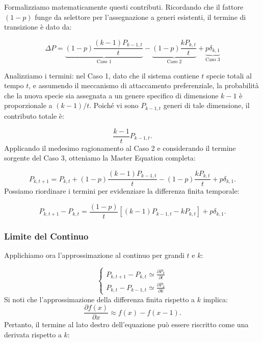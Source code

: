 \noindent Formalizziamo matematicamente questi contributi. Ricordando che il fattore $(1-p)$ funge da selettore per l'assegnazione a generi esistenti, il termine di transizione è dato da:

\begin{equation}
\Delta P =    \underbrace{(1-p) \frac{(k-1)P_{k-1,t}}{t}}_{\text{Caso 1}} - \underbrace{(1-p) \frac{k P_{k,t}}{t}}_{\text{Caso 2}} + \underbrace{p \delta_{k,1}}_{\text{Caso 3}}
\end{equation}

\noindent Analizziamo i termini: nel Caso 1, dato che il sistema contiene $t$ specie totali al tempo $t$, e assumendo il meccanismo di attaccamento preferenziale, la probabilità che la nuova specie sia assegnata a un genere specifico di dimensione $k-1$ è proporzionale a $(k-1)/t$. Poiché vi sono $P_{k-1,t}$ generi di tale dimensione, il contributo totale è:

\begin{equation}
    \frac{k-1}{t} P_{k-1,t}.
\end{equation}
Applicando il medesimo ragionamento al Caso 2 e considerando il termine sorgente del Caso 3, otteniamo la Master Equation completa:

\begin{equation}
    P_{k,t+1} = P_{k,t} + (1-p)\frac{(k-1)P_{k-1,t}}{t} - (1-p)\frac{k P_{k,t}}{t} + p \delta_{k,1}.
\end{equation}
Possiamo riordinare i termini per evidenziare la differenza finita temporale:

\begin{equation}
    P_{k,t+1} - P_{k,t} = \frac{(1-p)}{t} \left[ (k-1)P_{k-1,t} - k P_{k,t} \right] + p \delta_{k,1}.
\end{equation}

\subsubsection*{Limite del Continuo}

Applichiamo ora l'approssimazione al continuo per grandi $t$ e $k$:

\begin{equation}
    \begin{cases}
    P_{k,t+1} - P_{k,t} \simeq \frac{\partial P_{k}}{\partial t} \\
    P_{k,t} - P_{k-1,t} \simeq \frac{\partial P_{k}}{\partial k}
    \end{cases}
\end{equation}
Si noti che l'approssimazione della differenza finita rispetto a $k$ implica:
\begin{equation}
    \frac{\partial f(x)}{\partial x} \approx f(x) - f(x-1).
\end{equation}
Pertanto, il termine al lato destro dell'equazione può essere riscritto come una derivata rispetto a $k$:

